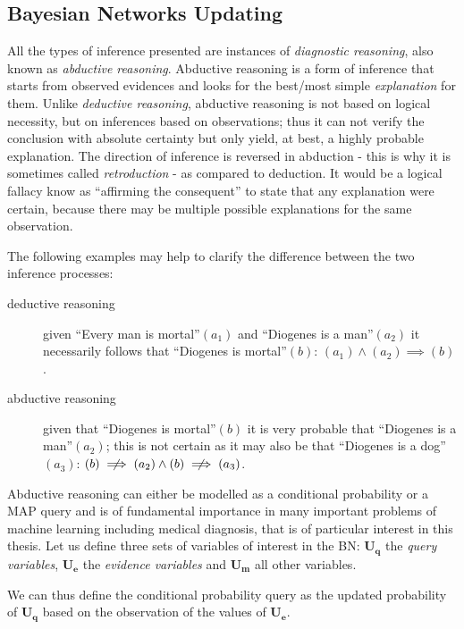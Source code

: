\subsection{Bayesian Networks Updating} \label{subsec:bnupdating}
All the types of inference presented are instances of \textit{diagnostic reasoning}, also known as \textit{abductive reasoning}. 
Abductive reasoning is a form of inference that starts from observed evidences and looks for the best/most simple \textit{explanation} for them.
Unlike \textit{deductive reasoning}, abductive reasoning is not based on logical necessity, but on inferences based on observations; thus it can not verify the conclusion with absolute certainty but only yield, at best, a highly probable explanation.
The direction of inference is reversed in abduction - this is why it is sometimes called \textit{retroduction} - as compared to deduction.
It would be a logical fallacy know as \enquote{affirming the consequent} to state that any explanation were certain, because there may be multiple possible explanations for the same observation.

The following examples may help to clarify the difference between the two inference processes:
\begin{description}
	\item[deductive reasoning] given \enquote{Every man is mortal}$(a_1)$ and \enquote{Diogenes is a man}$(a_2)$ it necessarily follows that \enquote{Diogenes is mortal}$(b)$: $(a_1) \wedge (a_2) \implies (b) $.
	\item[abductive reasoning] given that \enquote{Diogenes is mortal}$(b)$ it is very probable that \enquote{Diogenes is a man}$(a_2)$; this is not certain as it may also be that \enquote{Diogenes is a dog}$(a_3)$: $(b) \centernot\implies (a_2) \wedge (b) \centernot\implies (a_3) $.
\end{description}

Abductive reasoning can either be modelled as a conditional probability or a MAP query and is of fundamental importance in many important problems of machine learning including medical diagnosis, that is of particular interest in this thesis.
Let us define three sets of variables of interest in the BN: $\boldsymbol{U_q}$ the \textit{query variables}, $\boldsymbol{U_e}$ the \textit{evidence variables} and $\boldsymbol{U_m}$ all other variables.

We can thus define the conditional probability query as the updated probability of $\boldsymbol{U_q}$ based on the observation of the values of $\boldsymbol{U_e}$.


